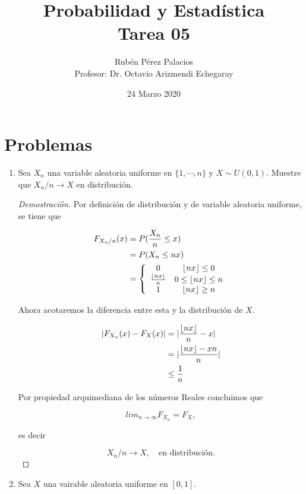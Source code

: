 \documentclass[letterpaper]{article}
\title{Probabilidad y Estadística\\Tarea 05}
\author{Rubén Pérez Palacios\\Profesor: Dr. Octavio Arizmendi Echegaray}
\date{24 Marzo 2020}
\theoremstyle{definition}
\theoremstyle{lemathm}
\theoremstyle{lemademthm}
\DeclarePairedDelimiter\floor{\lfloor}{\rfloor}
\begin{document}
	\maketitle
    
    \section*{Problemas}

    \begin{enumerate}
        
        \item Sea $X_n$ una variable aleatoria uniforme en $\{1, \cdots, n\}$ y $X \sim U(0,1)$. Muestre que $X_n / n \rightarrow X$ en distribución.
		
		\begin{proof}[Demostración]	
			
			Por definición de distribución y de variable aleatoria uniforme, se tiene que
			
			\begin{align*}
				F_{X_n / n}(x) &= P(\frac{X_n}{n} \leq x)\\
				&= P(X_n \leq nx)\\
				&= \left\{ \begin{array}{cc}
					0 & \floor*{nx} \leq 0\\
					\frac{\floor*{nx}}{n} & 0 \leq \floor*{nx} \leq n\\
					1 & \floor*{nx} \geq n
				\end{array} \right.\\
			\end{align*}
			
			Ahora acotaremos la diferencia entre esta y la distribución de $X$.
			
			\begin{align*}
				|F_{X_n}(x) - F_X(x)| &= |\frac{\floor*{nx}}{n} - x|\\
				&= |\frac{\floor*{nx} - xn}{n}|\\
				&\leq \frac{1}{n}
			\end{align*}
		
			Por propiedad arquimediana de los números Reales concluimos que
			
			\[lim_{n\to\infty} F_{X_n} = F_X,\]
			
			es decir
			
			\[X_n / n \rightarrow X, \quad \text{en distribución}.\]
		\end{proof}
		
		\item Sea $X$ una vairable aleatoria uniforme en $[0,1]$.
		

\end{enumerate}
\end{document}
